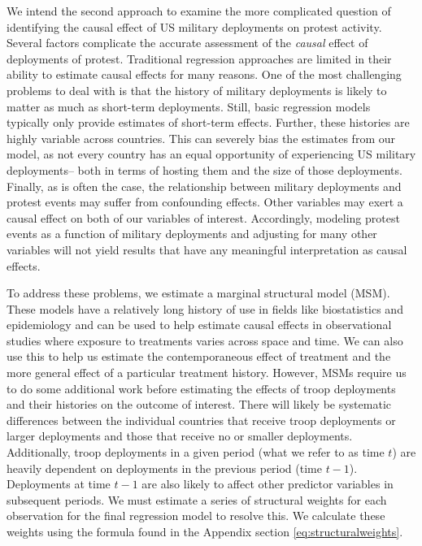 		We intend the second approach to examine the more complicated question of identifying the causal effect of US military deployments on protest activity. Several factors complicate the accurate assessment of the \textit{causal} effect of deployments of protest. Traditional regression approaches are limited in their ability to estimate causal effects for many reasons. One of the most challenging problems to deal with is that the history of military deployments is likely to matter as much as short-term deployments. Still, basic regression models typically only provide estimates of short-term effects. Further, these histories are highly variable across countries. This can severely bias the estimates from our model, as not every country has an equal opportunity of experiencing US military deployments-- both in terms of hosting them and the size of those deployments. Finally, as is often the case, the relationship between military deployments and protest events may suffer from confounding effects. Other variables may exert a causal effect on both of our variables of interest. Accordingly, modeling protest events as a function of military deployments and adjusting for many other variables will not yield results that have any meaningful interpretation as causal effects. 
		
		To address these problems, we estimate a marginal structural model (MSM).\cite{Robinsetal2000,BlackwellGlynn2018} These models have a relatively long history of use in fields like biostatistics and epidemiology and can be used to help estimate causal effects in observational studies where exposure to treatments varies across space and time. We can also use this to help us estimate the contemporaneous effect of treatment and the more general effect of a particular treatment history. However, MSMs require us to do some additional work before estimating the effects of troop deployments and their histories on the outcome of interest. There will likely be systematic differences between the individual countries that receive troop deployments or larger deployments and those that receive no or smaller deployments.
		Additionally, troop deployments in a given period (what we refer to as time $t$) are heavily dependent on deployments in the previous period (time $t-1$). Deployments at time $t-1$ are also likely to affect other predictor variables in subsequent periods. We must estimate a series of structural weights for each observation for the final regression model to resolve this. We calculate these weights using the formula found in the Appendix section \ref{eq:structuralweights}.
		
